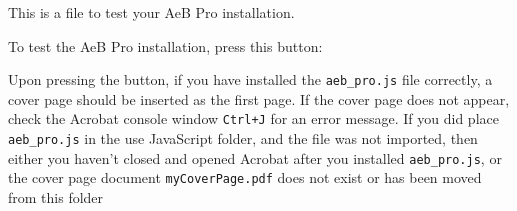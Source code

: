 \documentclass{article}
\begin{document}
This is a file to test your AeB Pro installation.

To test the \textsf{AeB Pro} installation, press this button: 

Upon pressing the button, if you have installed the \texttt{aeb\_pro.js} file
correctly, a cover page should be inserted as the first page. If the cover
page does not appear, check the \textsf{Acrobat} console window
\texttt{Ctrl+J} for an error message. If you did place \texttt{aeb\_pro.js}
in the use JavaScript folder, and the file was not imported, then either you
haven't closed and opened \textsf{Acrobat} after you installed \texttt{aeb\_pro.js},
or the cover page document \texttt{myCoverPage.pdf} does not exist or has
been moved from this folder
\end{document}
